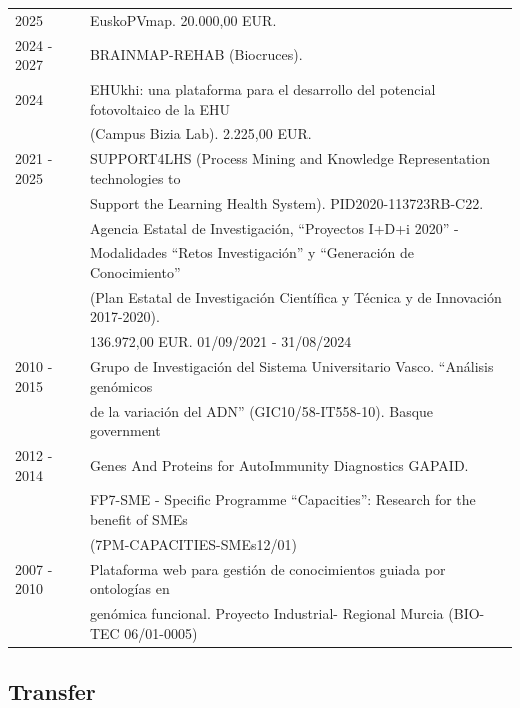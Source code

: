 \documentclass[11pt,fullpage]{article}
\begin{document}
\begin{tabular}{ll}
  2025        & EuskoPVmap. 20.000,00 EUR. \\
  2024 - 2027 & BRAINMAP-REHAB (Biocruces). \\
  2024        & EHUkhi: una plataforma para el desarrollo del potencial fotovoltaico de la EHU \\
              &  (Campus Bizia Lab). 2.225,00 EUR.\\
  2021 - 2025 & SUPPORT4LHS (Process Mining and Knowledge Representation technologies to \\ 
              & Support the Learning Health System). PID2020-113723RB-C22. \\ 
              & Agencia Estatal de Investigación, ``Proyectos I+D+i 2020'' - \\ 
              & Modalidades ``Retos Investigación'' y ``Generación de Conocimiento'' \\ 
              & (Plan Estatal de Investigación Científica y Técnica y de Innovación 2017-2020). \\
              & 136.972,00 EUR. 01/09/2021 - 31/08/2024 \\
  2010 - 2015 & Grupo de Investigación del Sistema Universitario Vasco. ``Análisis genómicos \\  
              & de la variación del ADN'' (GIC10/58-IT558-10). Basque government \\
  2012 - 2014 & Genes And Proteins for AutoImmunity Diagnostics GAPAID. \\ 
              & FP7-SME - Specific Programme ``Capacities'': Research for the benefit of SMEs \\ 
              & (7PM-CAPACITIES-SMEs12/01) \\
  2007 - 2010 & Plataforma web para gesti\'on de conocimientos guiada por ontolog\'ias en \\ 
              & gen\'omica funcional. Proyecto Industrial- Regional Murcia (BIO-TEC 06/01-0005) 
\end{tabular}

\subsection*{Transfer}
\end{document}
